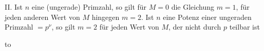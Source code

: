 \par II. Ist $n$ eine (ungerade) Primzahl, so gilt für $M=0$ die Gleichung $m=1$, für jeden anderen Wert von $M$ hingegen $m=2$. Ist $n$ eine Potenz einer ungeraden Primzahl $=p^\nu$, so gilt $m=2$ für jeden Wert von $M$, der nicht durch $p$ teilbar ist\quad\textemdash
\par\nobreak\noindent\hbox to\linewidth{\textemdash\hfil\textemdash\hfil\textemdash\hfil\textemdash\hfil\textemdash\hfil\textemdash\hfil\textemdash\hfil\textemdash\hfil\textemdash\hfil\textemdash\hfil\textemdash\hfil\textemdash\hfil\textemdash\hfil\textemdash\hfil\textemdash\hfil\textemdash\hfil\textemdash}\par

